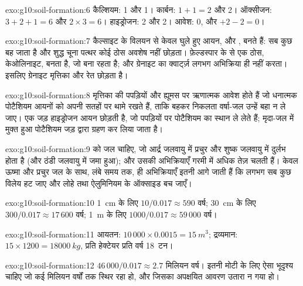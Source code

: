 \begin{solution}{exo:g10:soil-formation:6}
कैल्शियम: 1 और 1। कार्बन: $1 + 1 = 2$ और 2। ऑक्सीजन: $3 + 2 + 1 = 6$ और
$2 \times 3 = 6$। हाइड्रोजन: 2 और 2। आवेश: 0, और $+2 - 2 = 0$।
\end{solution}

\begin{solution}{exo:g10:soil-formation:7}
कैल्साइट के विलयन से केवल घुले हुए आयन,  और
, बनते हैं: सब कुछ बह जाता है और शुद्ध चूना पत्थर कोई ठोस
अवशेष नहीं छोड़ता। फ़ेल्डस्पार के  से एक ठोस, केओलिनाइट, बनता है, जो बना रहता है;
और ग्रेनाइट का क्वार्ट्ज़ लगभग अभिक्रिया ही नहीं करता। इसलिए ग्रेनाइट
मृत्तिका और रेत छोड़ता है।
\end{solution}

\begin{solution}{exo:g10:soil-formation:8}
मृत्तिका की पपड़ियों और ह्यूमस पर ऋणात्मक आवेश होते हैं जो धनात्मक
पोटैशियम आयनों  को अपनी सतहों पर थामे रखते हैं, ताकि बहकर निकलता वर्षा-जल
उन्हें बहा न ले जाए। एक जड़ हाइड्रोजन आयन छोड़ती है, जो पपड़ियों पर पोटैशियम का
स्थान ले लेते हैं; मृदा-जल में मुक्त हुआ पोटैशियम
जड़ द्वारा ग्रहण कर लिया जाता है।
\end{solution}

\begin{solution}{exo:g10:soil-formation:9}
 को जल चाहिए, जो आर्द्र जलवायु में प्रचुर और शुष्क जलवायु में दुर्लभ होता है
(और ठंडी जलवायु में जमा हुआ); और उसकी अभिक्रियाएँ गरमी में अधिक तेज़ चलती
हैं। केवल ऊष्मा और प्रचुर जल के साथ, लंबे समय तक, ही अभिक्रियाएँ
इतनी आगे जाती हैं कि लगभग सब कुछ विलेय हट जाए और लोहे तथा
ऐलुमिनियम के ऑक्साइड बच जाएँ।
\end{solution}

\begin{solution}{exo:g10:soil-formation:10}
\qty{1}{cm} के लिए $10/0.017 \approx 590$ वर्ष; \qty{30}{cm} के लिए $300/0.017 \approx 17\,600$
वर्ष; \qty{1}{m} के लिए $1000/0.017 \approx 59\,000$ वर्ष।
\end{solution}

\begin{solution}{exo:g10:soil-formation:11}
आयतन: $10\,000 \times 0.0015 = \qty{15}{m^3}$; द्रव्यमान: $15 \times 1200 =
\qty{18000}{kg}$, प्रति हेक्टेयर प्रति वर्ष \num{18}~टन।
\end{solution}

\begin{solution}{exo:g10:soil-formation:12}
$46\,000/0.017 \approx 2.7$ मिलियन वर्ष। इतनी मोटी  के लिए ऐसा
भूदृश्य चाहिए जो कई मिलियन वर्षों तक स्थिर रहा हो, और जिसका अपक्षयित आवरण
उतारा न गया हो।
\end{solution}

